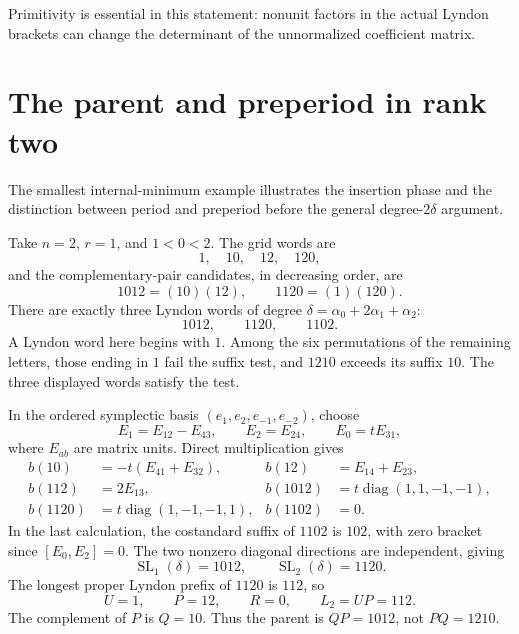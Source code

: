 \documentclass[11pt]{amsart}
\numberwithin{equation}{section}
\theoremstyle{definition}
\DeclareMathOperator{\SL}{SL}
\DeclareMathOperator{\diag}{diag}
\newcommand{\br}[1]{b(#1)}
\begin{document}
Primitivity is essential in this statement: nonunit factors in the actual Lyndon brackets can change the determinant of the unnormalized coefficient matrix.

\section{The parent and preperiod in rank two}\label{sec:ranktwo}

The smallest internal-minimum example illustrates the insertion phase and the distinction between period and preperiod before the general degree-$2\delta$ argument.

Take $n=2$, $r=1$, and $1<0<2$. The grid words are
\[
 1,\quad10,\quad12,\quad120,
\]
and the complementary-pair candidates, in decreasing order, are
\[
 1012=(10)(12),\qquad1120=(1)(120).
\]
There are exactly three Lyndon words of degree $\delta=\alpha_0+2\alpha_1+\alpha_2$:
\[
 1012,\qquad1120,\qquad1102.
\]
A Lyndon word here begins with $1$. Among the six permutations of the remaining letters, those ending in $1$ fail the suffix test, and $1210$ exceeds its suffix $10$. The three displayed words satisfy the test.

In the ordered symplectic basis $(e_1,e_2,e_{-1},e_{-2})$, choose
\[
 E_1=E_{12}-E_{43},\qquad E_2=E_{24},\qquad E_0=tE_{31},
\]
where $E_{ab}$ are matrix units. Direct multiplication gives
\begin{align*}
 \br{10}&=-t(E_{41}+E_{32}),&
 \br{12}&=E_{14}+E_{23},\\
 \br{112}&=2E_{13},&
 \br{1012}&=t\diag(1,1,-1,-1),\\
 \br{1120}&=t\diag(1,-1,-1,1),&
 \br{1102}&=0.
\end{align*}
In the last calculation, the costandard suffix of $1102$ is $102$, with zero bracket since $[E_0,E_2]=0$. The two nonzero diagonal directions are independent, giving
\begin{equation}\label{eq:c2-words}
 \SL_1(\delta)=1012,\qquad\SL_2(\delta)=1120.
\end{equation}
The longest proper Lyndon prefix of $1120$ is $112$, so
\begin{equation}\label{eq:c2-factors}
 U=1,\qquad P=12,\qquad R=0,\qquad L_2=UP=112.
\end{equation}
The complement of $P$ is $Q=10$. Thus the parent is $QP=1012$, not $PQ=1210$.
\end{document}
